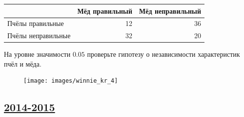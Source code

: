 \begin{enumerate}
\begin{center}
\begin{tabular}{lrr}
\toprule
 & Мёд правильный & Мёд неправильный \\
\midrule
Пчёлы правильные & 12	& 36 \\
Пчёлы неправильные & 32	& 20 \\
\bottomrule
\end{tabular}
\end{center}

На уровне значимости $0.05$ проверьте гипотезу о независимости характеристик пчёл и мёда.

\begin{figure}[b]
\centering
\texttt{[image: images/winnie\_kr\_4]}
\end{figure}
\end{enumerate}



\newpage
\subsection[2014-2015]{\hyperref[sec:sol_kr_04_2014_2015]{2014-2015}}
\label{sec:kr_04_2014_2015}

